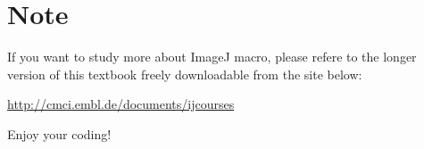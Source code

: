 \section{Note}

If you want to study more about ImageJ macro, please refere to the longer version of this textbook freely downloadable from the site below:

\url{http://cmci.embl.de/documents/ijcourses}

Enjoy your coding!